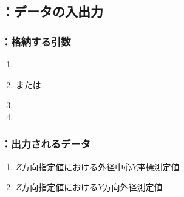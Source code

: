\subsection{\MYOThickness：データの入出力}

\subsubsection{\MYOThickness：格納する引数}
\begin{enumerate}[label*=\sarrow]
\item \PMBDOD
\item \PMTopReAlocationLength または\PMBottomReAlocationLength
\item \PMKeywayPos
\item \PMKeywayWidth
\end{enumerate}

\subsubsection{\MYOThickness：出力されるデータ}
\begin{enumerate}[label*=\sarrow]
\item $Z$方向指定値における外径中心$Y$座標測定値
\item $Z$方向指定値における$Y$方向外径測定値
\end{enumerate}

